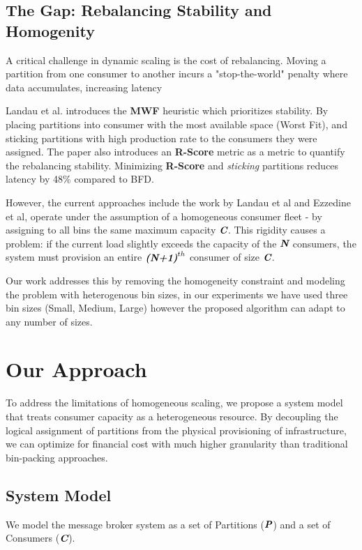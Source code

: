 ﻿\documentclass[conference]{IEEEtran}
\def\mathbi#1{\textbf{\em #1}}
\begin{document}
\subsection{The Gap: Rebalancing Stability and Homogenity}
A critical challenge in dynamic scaling is the cost of rebalancing. Moving a partition from one consumer to another incurs a "stop-the-world" penalty where data accumulates, increasing latency

Landau et al. introduces the \textbf{MWF} heuristic which prioritizes stability. By placing partitions into consumer with the most available space (Worst Fit), and sticking partitions with high production rate to the consumers they were assigned. The paper also introduces an \textbf{R-Score} metric as a metric to quantify the rebalancing stability. Minimizing \textbf{R-Score} and \textit{sticking} partitions reduces latency by 48\% compared to BFD. \cite{Landau2025}

However, the current approaches include the work by Landau et al and Ezzedine et al, operate under the assumption of a homogeneous consumer fleet - by assigning to all bins the same maximum capacity $\mathbi{C}$. This rigidity causes a problem: if the current load slightly exceeds the capacity of the $\mathbi{N}$ consumers, the system must provision an entire $\mathbi{(N+1)}^{th}$ consumer of size $\mathbi{C}$. 

Our work addresses this by removing the homogeneity constraint and modeling the problem with heterogenous bin sizes, in our experiments we have used three bin sizes (Small, Medium, Large) however the proposed algorithm can adapt to any number of sizes. 
\section{Our Approach}

To address the limitations of homogeneous scaling, we propose a system model that treats consumer capacity as a heterogeneous resource. By decoupling the logical assignment of partitions from the physical provisioning of infrastructure, we can optimize for financial cost with much higher granularity than traditional bin-packing approaches.

\subsection{System Model}

We model the message broker system as a set of Partitions ($\mathbi{P}$) and a set of Consumers ($\mathbi{C}$).
\end{document}
